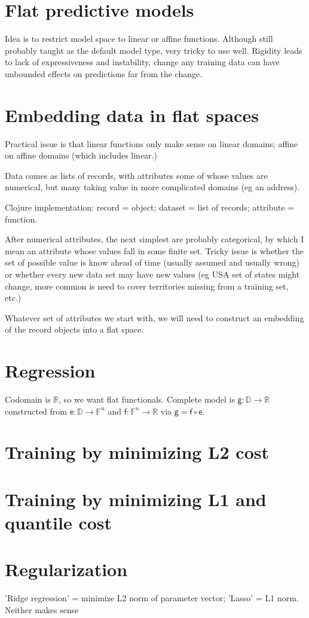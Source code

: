 \section{Flat predictive models}

Idea is to restrict model space to linear or affine functions.
Although still probably taught as the default model type,
very tricky to use well. Rigidity leads to lack of
expressiveness and instability, change any training data can
have unbounded effects on predictions far from the change.

\section{Embedding data in flat spaces}

Practical issue is that linear functions only make sense on
linear domains; affine on affine domains (which includes
linear.)

Data comes as lists of records, with attributes some of whose
values are numerical, but many taking value in more complicated
domains (eg an address).

Clojure implementation: record = object; dataset = list of
records; attribute = function.

After numerical attributes, the next simplest are probably
categorical, by which I mean an attribute whose values fall in
some finite set. Tricky issue is whether the set of possible
value is know ahead of time (usually assumed and usually wrong)
or whether every new data set may have new values
(eg USA set of states might change, more common is need to cover
territories missing from a training set, etc.)

Whatever set of attributes we start with, we will need to
construct an embedding of the record objects into a flat space.

\section{Regression}

Codomain is \( \mathbb{R} \), so we want flat functionals.
Complete model is \( \mathsf{g} : \mathbb{D} \rightarrow
\mathbb{R} \) constructed from 
\( \mathsf{e} : \mathbb{D} \rightarrow \mathbb{F}^n \)
and 
\( \mathsf{f} : \mathbb{F}^n \rightarrow \mathbb{R} \) 
via \( \mathsf{g} = \mathsf{f} \circ \mathsf{e} \). 

\section{Training by minimizing L2 cost}

\section{Training by minimizing L1 and quantile cost}

\section{Regularization}

'Ridge regression' = minimize L2 norm of parameter vector;
'Lasso' = L1 norm.
Neither makes sense
\newpage{}



